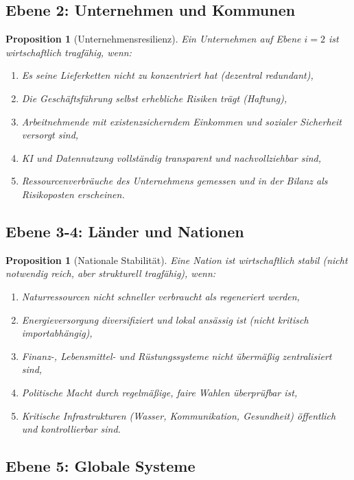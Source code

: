 \documentclass[a4paper, 12pt, twoside, openright]{report}
\newtheorem{proposition}[theorem]{Proposition}
\theoremstyle{definition}
\theoremstyle{definition}
\begin{document}
\subsection{Ebene 2: Unternehmen und Kommunen}

\begin{proposition}[Unternehmensresilienz]
Ein Unternehmen auf Ebene $i=2$ ist wirtschaftlich tragfähig, wenn:
\begin{enumerate}
\item Es seine Lieferketten nicht zu konzentriert hat (dezentral redundant),
\item Die Geschäftsführung selbst erhebliche Risiken trägt (Haftung),
\item Arbeitnehmende mit existenzsicherndem Einkommen und sozialer Sicherheit versorgt sind,
\item KI und Datennutzung vollständig transparent und nachvollziehbar sind,
\item Ressourcenverbräuche des Unternehmens gemessen und in der Bilanz als Risikoposten erscheinen.
\end{enumerate}
\end{proposition}

\subsection{Ebene 3-4: Länder und Nationen}

\begin{proposition}[Nationale Stabilität]
Eine Nation ist wirtschaftlich stabil (nicht notwendig reich, aber strukturell tragfähig), wenn:
\begin{enumerate}
\item Naturressourcen nicht schneller verbraucht als regeneriert werden,
\item Energieversorgung diversifiziert und lokal ansässig ist (nicht kritisch importabhängig),
\item Finanz-, Lebensmittel- und Rüstungssysteme nicht übermäßig zentralisiert sind,
\item Politische Macht durch regelmäßige, faire Wahlen überprüfbar ist,
\item Kritische Infrastrukturen (Wasser, Kommunikation, Gesundheit) öffentlich und kontrollierbar sind.
\end{enumerate}
\end{proposition}

\subsection{Ebene 5: Globale Systeme}
\end{document}
